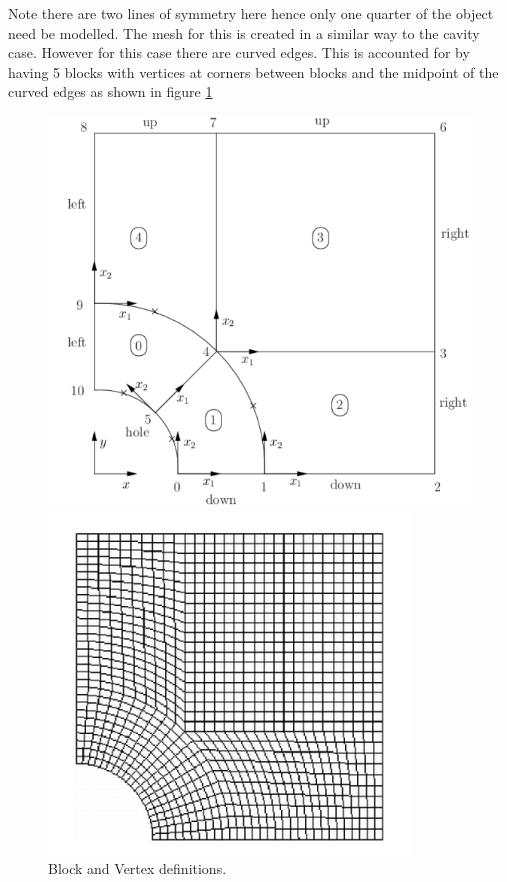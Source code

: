 \documentclass[]{report}
\begin{document}
Note there are two lines of symmetry here hence only one quarter of the object need be modelled. The mesh for this is created in a similar way to the cavity case. However for this case there are curved edges. This is accounted for by having 5 blocks with vertices at corners between blocks and the midpoint of the curved edges as shown in figure \ref{fig:stress_cell_def}

\begin{figure}[h]
	
	\begin{minipage}[h]{0.5\textwidth}
		\centering
	\includegraphics[width = \textwidth]{stress_blocks}
	\caption{Block and Vertex definitions.}
	\label{fig:stress_cell_def}
	\end{minipage}
	\begin{minipage}[h]{0.5\textwidth}
		\centering
	\includegraphics[width = \textwidth]{stress_mesh}

\end{minipage}
\end{figure}
\end{document}
